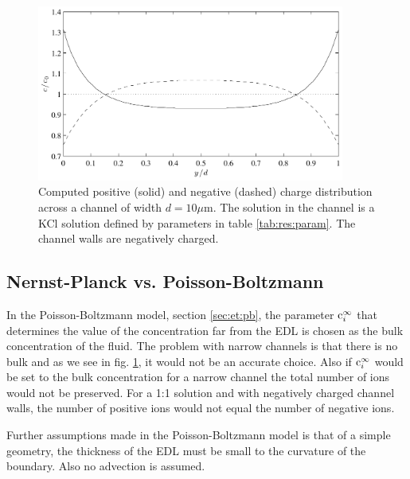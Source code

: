 \begin{figure}
\begin{center}
\includegraphics[width=0.9\textwidth]{fig/charge_1d.pdf}
\end{center}
\caption{Computed positive (solid) and negative (dashed) charge
  distribution across a channel of width $d = 10 \mu$m. The solution
  in the channel is a KCl solution defined by parameters in table
  \ref{tab:res:param}. The channel walls are negatively charged.}
\label{fig:res:c_1d}
\end{figure}

\subsection{Nernst-Planck vs. Poisson-Boltzmann}
In the Poisson-Boltzmann model, section \ref{sec:et:pb}, the parameter
$\mathrm{c}_i^{\infty}$ that determines the value of the concentration far
from the EDL is chosen as the bulk concentration of the fluid. The
problem with narrow channels is that there is no bulk and as we see in
fig. \ref{fig:res:c_1d}, it would not be an accurate choice. Also if
$\mathrm{c}_i^{\infty}$ would be set to the bulk concentration for a narrow
channel the total number of ions would not be preserved. For a 1:1
solution and with negatively charged channel walls, the number of
positive ions would not equal the number of negative ions.

Further assumptions made in the Poisson-Boltzmann model is that of a
simple geometry, the thickness of the EDL must be small to the
curvature of the boundary. Also no advection is assumed. 


